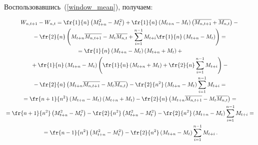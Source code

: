     Воспользовавшись~(\ref{window_mean}), получаем:


    \begin{multline*}


        W_{n,t+1} - W_{n,t} =


            \fr{1}{n}\left(M^2_{t+n} - M^2_t\right) +


            \fr{1}{n}\left(M_{t+n} - M_t\right)\left(\overline{M_{n,t+1}} +


            \overline{M_{n,t}}\right) - {}\\


            {}- \fr{2}{n}\left(M_{t+n}\overline{M_{n,t+1}} - M_t\overline{M_{n,t}}


            + \sum\limits^{n-1}_{i=1}M_{t+i}\fr{1}{n}\left(M_{t+n} -


            M_t\right)\right) ={} \\


            {}=


            \fr{1}{n}\left(M_{t+n} - M_t\right)\left(M_{t+n} + M_t\right) +{} \\


            {}+ \fr{1}{n}\left(M_{t+n} - M_t\right)\left(\fr{1}{n}\left(


            M_{t+n} + M_t\right) + \fr{2}{n}\sum\limits^{n-1}_{i=1}M_{t+i}\right) - {}\\


            {} - \fr{2}{n}\left(M_{t+n}\overline{M_{n,t+1}} -


            M_t\overline{M_{n,t}}\right) - \fr{2}{n^2}\left(M_{t+n} - M_t\right)


            \sum\limits^{n-1}_{i=1}M_{t+i} ={} \\


            {}=


            \fr{n+1}{n^2}\left(M_{t+n} - M_t\right)\left(M_{t+n} + M_t\right) -


            \fr{2}{n}\left(M_{t+n}\overline{M_{n,t+1}} - M_t\overline{M_{n,t}}


            \right) ={} \\


            {}=


            \fr{n+1}{n^2}\left(M_{t+n}^2 - M_t^2\right) -


            \fr{2}{n^2}\left(M_{t+n}^2 - M_t^2\right) -


            \fr{2}{n^2}\left(M_{t+n} - M_t\right)\sum\limits^{n-1}_{i=1}M_{t+i} ={} \\


            {} =


            \fr{n-1}{n^2}\left(M_{t+n}^2 - M_t^2\right) -


            \fr{2}{n^2}\left(M_{t+n} - M_t\right)\sum\limits^{n-1}_{i=1}M_{t+i}\,.


\end{multline*}






